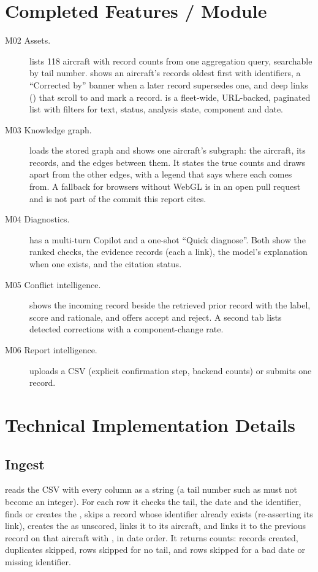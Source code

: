 \section{Completed Features / Module}
\begin{description}
\item[M02 Assets.]  lists 118 aircraft with record counts from one aggregation query, searchable by tail number.  shows an aircraft's records oldest first with identifiers, a ``Corrected by'' banner when a later record supersedes one, and deep links () that scroll to and mark a record.  is a fleet-wide, URL-backed, paginated list with filters for text, status, analysis state, component and date.
\item[M03 Knowledge graph.]  loads the stored graph and shows one aircraft's subgraph: the aircraft, its records, and the edges between them. It states the true counts and draws  apart from the other edges, with a legend that says where each comes from. A fallback for browsers without WebGL is in an open pull request and is not part of the commit this report cites.
\item[M04 Diagnostics.]  has a multi-turn Copilot and a one-shot ``Quick diagnose''. Both show the ranked checks, the evidence records (each a link), the model's explanation when one exists, and the citation status.
\item[M05 Conflict intelligence.]  shows the incoming record beside the retrieved prior record with the label, score and rationale, and offers accept and reject. A second tab lists detected corrections with a component-change rate.
\item[M06 Report intelligence.]  uploads a CSV (explicit confirmation step, backend counts) or submits one record.
\end{description}

\section{Technical Implementation Details}
\subsection{Ingest}
 reads the CSV with every column as a string (a tail number such as  must not become an integer). For each row it checks the tail, the date and the identifier, finds or creates the , skips a record whose identifier already exists (re-asserting its  link), creates the  as unscored, links it to its aircraft, and links it to the previous record on that aircraft with , in date order. It returns counts: records created, duplicates skipped, rows skipped for no tail, and rows skipped for a bad date or missing identifier.


